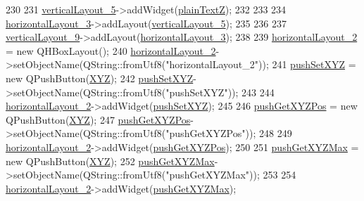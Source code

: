 \begin{DoxyCode}
230 
231         \hyperlink{class_ui___e3_p_j_r_acbe0600e63ca9c63fe807730289e677a}{verticalLayout\_5}->addWidget(\hyperlink{class_ui___e3_p_j_r_aa688da4507156fb25ab31678d45842c9}{plainTextZ});
232 
233 
234         \hyperlink{class_ui___e3_p_j_r_af1b2167ad3027fe2c2328701164e54ec}{horizontalLayout\_3}->addLayout(\hyperlink{class_ui___e3_p_j_r_acbe0600e63ca9c63fe807730289e677a}{verticalLayout\_5});
235 
236 
237         \hyperlink{class_ui___e3_p_j_r_a7c00a0b53a83fa0709131b996a6249a9}{verticalLayout\_9}->addLayout(\hyperlink{class_ui___e3_p_j_r_af1b2167ad3027fe2c2328701164e54ec}{horizontalLayout\_3});
238 
239         \hyperlink{class_ui___e3_p_j_r_a535a43287b7a5605cfc11580d146d3fb}{horizontalLayout\_2} = \textcolor{keyword}{new} QHBoxLayout();
240         \hyperlink{class_ui___e3_p_j_r_a535a43287b7a5605cfc11580d146d3fb}{horizontalLayout\_2}->setObjectName(QString::fromUtf8(\textcolor{stringliteral}{"horizontalLayout\_2"}));
241         \hyperlink{class_ui___e3_p_j_r_a95989982eaebbf117db602b9c5642fc5}{pushSetXYZ} = \textcolor{keyword}{new} QPushButton(\hyperlink{class_ui___e3_p_j_r_a098a80b873d9e0a09fd834f09e5028b4}{XYZ});
242         \hyperlink{class_ui___e3_p_j_r_a95989982eaebbf117db602b9c5642fc5}{pushSetXYZ}->setObjectName(QString::fromUtf8(\textcolor{stringliteral}{"pushSetXYZ"}));
243 
244         \hyperlink{class_ui___e3_p_j_r_a535a43287b7a5605cfc11580d146d3fb}{horizontalLayout\_2}->addWidget(\hyperlink{class_ui___e3_p_j_r_a95989982eaebbf117db602b9c5642fc5}{pushSetXYZ});
245 
246         \hyperlink{class_ui___e3_p_j_r_a5a172ff2cdd7f0b1731e866267981cd4}{pushGetXYZPos} = \textcolor{keyword}{new} QPushButton(\hyperlink{class_ui___e3_p_j_r_a098a80b873d9e0a09fd834f09e5028b4}{XYZ});
247         \hyperlink{class_ui___e3_p_j_r_a5a172ff2cdd7f0b1731e866267981cd4}{pushGetXYZPos}->setObjectName(QString::fromUtf8(\textcolor{stringliteral}{"pushGetXYZPos"}));
248 
249         \hyperlink{class_ui___e3_p_j_r_a535a43287b7a5605cfc11580d146d3fb}{horizontalLayout\_2}->addWidget(\hyperlink{class_ui___e3_p_j_r_a5a172ff2cdd7f0b1731e866267981cd4}{pushGetXYZPos});
250 
251         \hyperlink{class_ui___e3_p_j_r_a16f1701307e43c614a3c0aed623577b7}{pushGetXYZMax} = \textcolor{keyword}{new} QPushButton(\hyperlink{class_ui___e3_p_j_r_a098a80b873d9e0a09fd834f09e5028b4}{XYZ});
252         \hyperlink{class_ui___e3_p_j_r_a16f1701307e43c614a3c0aed623577b7}{pushGetXYZMax}->setObjectName(QString::fromUtf8(\textcolor{stringliteral}{"pushGetXYZMax"}));
253 
254         \hyperlink{class_ui___e3_p_j_r_a535a43287b7a5605cfc11580d146d3fb}{horizontalLayout\_2}->addWidget(\hyperlink{class_ui___e3_p_j_r_a16f1701307e43c614a3c0aed623577b7}{pushGetXYZMax});

\end{DoxyCode}
